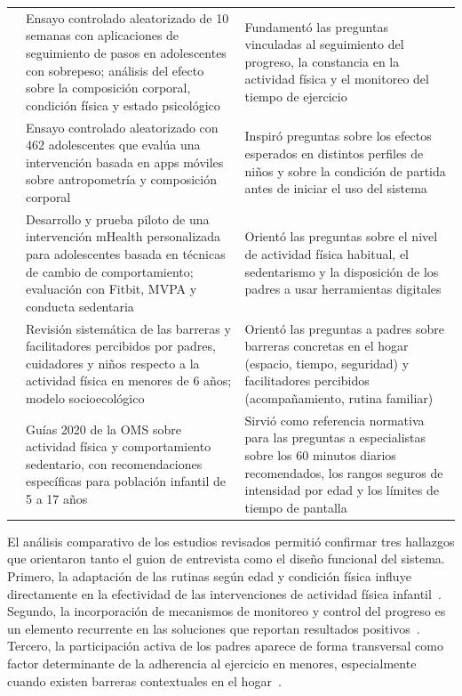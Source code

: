 \begin{longtable}{p{0.75cm}p{6.45cm}p{6.75cm}}
					\cite{Domin2022} & Ensayo controlado aleatorizado de 10 semanas con aplicaciones de seguimiento de pasos en adolescentes con sobrepeso; análisis del efecto sobre la composición corporal, condición física y estado psicológico & Fundamentó las preguntas vinculadas al seguimiento del progreso, la constancia en la actividad física y el monitoreo del tiempo de ejercicio\\
					\cite{GomezCuesta2024} & Ensayo controlado aleatorizado con 462 adolescentes que evalúa una intervención basada en apps móviles sobre antropometría y composición corporal & Inspiró preguntas sobre los efectos esperados en distintos perfiles de niños y sobre la condición de partida antes de iniciar el uso del sistema\\
					\cite{MateoOrcajada2024} & Desarrollo y prueba piloto de una intervención mHealth personalizada para adolescentes basada en técnicas de cambio de comportamiento; evaluación con Fitbit, MVPA y conducta sedentaria & Orientó las preguntas sobre el nivel de actividad física habitual, el sedentarismo y la disposición de los padres a usar herramientas digitales\\
					\cite{Schoeppe2017} & Revisión sistemática de las barreras y facilitadores percibidos por padres, cuidadores y niños respecto a la actividad física en menores de 6 años; modelo socioecológico & Orientó las preguntas a padres sobre barreras concretas en el hogar (espacio, tiempo, seguridad) y facilitadores percibidos (acompañamiento, rutina familiar)\\
					\cite{Bull2020} & Guías 2020 de la OMS sobre actividad física y comportamiento sedentario, con recomendaciones específicas para población infantil de 5 a 17 años & Sirvió como referencia normativa para las preguntas a especialistas sobre los 60 minutos diarios recomendados, los rangos seguros de intensidad por edad y los límites de tiempo de pantalla\\
				\end{longtable}
				\vspace{12pt}
				\tblnote
				\endgroup
				
				El análisis comparativo de los estudios revisados permitió confirmar tres hallazgos que orientaron tanto el guion de entrevista como el diseño funcional del sistema. Primero, la adaptación de las rutinas según edad y condición física influye directamente en la efectividad de las intervenciones de actividad física infantil~\cite{Baumann2022,Schoeppe2017}. Segundo, la incorporación de mecanismos de monitoreo y control del progreso es un elemento recurrente en las soluciones que reportan resultados positivos~\cite{WangJun2024,Domin2022}. Tercero, la participación activa de los padres aparece de forma transversal como factor determinante de la adherencia al ejercicio en menores, especialmente cuando existen barreras contextuales en el hogar~\cite{Schoeppe2017,VegaDiaz2023}.
				

